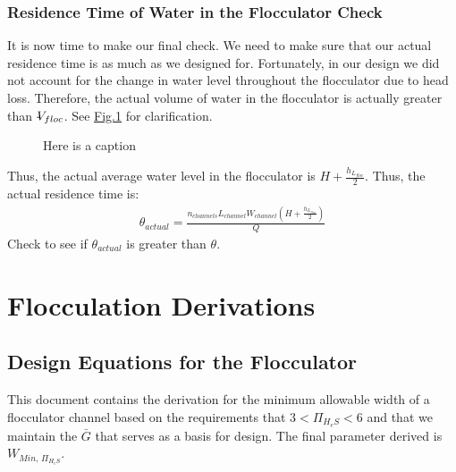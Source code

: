 \documentclass[letterpaper,10pt,english]{sphinxmanual}
\let\sphinxpxdimen\pdfpxdimen\else\newdimen\sphinxpxdimen
\begin{document}
\subsection{Residence Time of Water in the Flocculator Check}
\label{\detokenize{Flocculation/Floc_Design:residence-time-of-water-in-the-flocculator-check}}
It is now time to make our final check. We need to make sure that our actual residence time is  as much as we designed for. Fortunately, in our design we did not account for the change in water level throughout the flocculator due to head loss. Therefore, the actual volume of water in the flocculator is actually greater than \(\rlap{-} V_{floc}\). See \hyperref[\detokenize{Flocculation/Floc_Design:figure-flocculator-head-loss}]{Fig.\@ \ref{\detokenize{Flocculation/Floc_Design:figure-flocculator-head-loss}}} for clarification.

\begin{figure}[htbp]
\centering
\capstart

\noindent\sphinxincludegraphics[width=400\sphinxpxdimen]{{Flocculator_head_loss}.jpg}
\caption{Here is a caption}\label{\detokenize{Flocculation/Floc_Design:id10}}\label{\detokenize{Flocculation/Floc_Design:figure-flocculator-head-loss}}\end{figure}

Thus, the actual average water level in the flocculator is \(H + \frac{h_{L_{floc}}}{2}\). Thus, the actual residence time is:
\begin{equation}\label{equation:Flocculation/Floc_Design:Flocculation/Floc_Design:41}
\begin{split}\theta_{actual} = \frac{n_{channels} L_{channel} W_{channel} \left( H + \frac{h_{L_{floc}}}{2} \right)} {Q}\end{split}
\end{equation}
Check to see if \(\theta_{actual}\) is greater than \(\theta\).


\chapter{Flocculation Derivations}
\label{\detokenize{Flocculation/Floc_Derivations:flocculation-derivations}}\label{\detokenize{Flocculation/Floc_Derivations:title-flocculation-derivations}}\label{\detokenize{Flocculation/Floc_Derivations::doc}}

\section{Design Equations for the Flocculator}
\label{\detokenize{Flocculation/Floc_Derivations:design-equations-for-the-flocculator}}\label{\detokenize{Flocculation/Floc_Derivations:heading-design-equations-for-the-flocculator}}
This document contains the derivation for the minimum allowable width of
a flocculator channel based on the requirements that
\(3 < \Pi_{H_eS} < 6\) and that we maintain the \(\bar G\) that
serves as a basis for design. The final parameter derived is
\(W_{Min, \, \Pi_{H_eS}}\).
\end{document}
